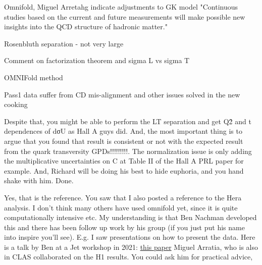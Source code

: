     
    Omnifold, Miguel Arretahg
    indicate adjustments to GK model 
     "Continuous
    studies based on the current and future measurements will make possible new insights
    into the QCD structure of hadronic matter."
    
    Rosenbluth separation - not very large
    
    
    Comment on factorization theorem and sigma L vs sigma T
    
    OMNIFold method
    
    Pass1 data suffer from CD mis-alignment and other issues solved in the new cooking
    
    
    Despite that, you might be able to perform the LT separation and get Q\^2 and t dependences of dσU as Hall A guys did. And, the most important thing is to argue that you found that result is consistent or not with the expected result from the quark transversity GPDs!!!!!!!!!. The normalization issue is only adding the multiplicative uncertainties on C at Table II of the Hall A PRL paper for example. And, Richard will be doing his best to hide euphoria, and you hand shake with him. Done.
    
    
        Yes, that is the reference. You saw that I also posted a reference to the Hera analysis. I don’t think many others have used omnifold yet, since it is quite computationally intensive etc.
    My understanding is that Ben Nachman developed this and there has been follow up work by his group (if you just put his name into inspire you’ll see). E.g. I saw presentations on how to present the data. Here is a talk by Ben at a Jet workshop in 2021: \href{https://indico.bnl.gov/event/10555/contributions/54721/attachments/37368/61570/H1Measurement_EICWorkshopSeptember2021.pdf}{this paper}
     Miguel Arratia, who is also in CLAS collaborated on the H1 results. You could ask him for practical advice,
    


    \fi










